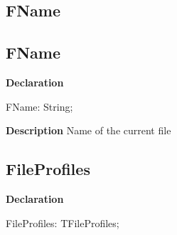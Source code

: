 \documentclass{report}
\newif\ifpdf
\begin{document}
\subsection*{\large{\textbf{FName}}\normalsize\hspace{1ex}\hrulefill}
\else
\subsection*{FName}
\fi
\label{editor-FName}
\begin{list}{}{
\setlength{\itemindent}{0cm}
\setlength{\listparindent}{0cm}
\setlength{\leftmargin}{\evensidemargin}
\addtolength{\leftmargin}{\tmplength}
\settowidth{\labelsep}{X}
\addtolength{\leftmargin}{\labelsep}
\setlength{\labelwidth}{\tmplength}
}
\item[\textbf{Declaration}\hfill]
\ifpdf
\begin{flushleft}
\fi
\begin{ttfamily}
FName: String;\end{ttfamily}

\ifpdf
\end{flushleft}
\fi

\par
\item[\textbf{Description}]
Name of the current file

\end{list}
\ifpdf
\subsection*{\large{\textbf{FileProfiles}}\normalsize\hspace{1ex}\hrulefill}
\else
\subsection*{FileProfiles}
\fi
\label{editor-FileProfiles}
\begin{list}{}{
\setlength{\itemindent}{0cm}
\setlength{\listparindent}{0cm}
\setlength{\leftmargin}{\evensidemargin}
\addtolength{\leftmargin}{\tmplength}
\settowidth{\labelsep}{X}
\addtolength{\leftmargin}{\labelsep}
\setlength{\labelwidth}{\tmplength}
}
\item[\textbf{Declaration}\hfill]
\ifpdf
\begin{flushleft}
\fi
\begin{ttfamily}
FileProfiles: TFileProfiles;\end{ttfamily}

\ifpdf
\end{flushleft}
\fi

\end{list}
\end{document}
